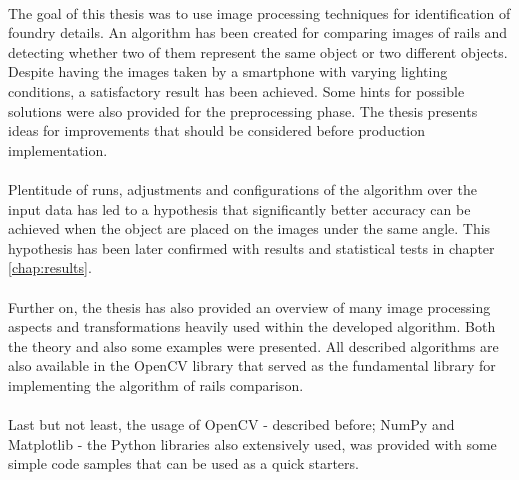 \paragraph{}
The goal of this thesis was to use image processing techniques for identification of foundry details. An algorithm has been created for comparing images of rails and detecting whether two of them represent the same object or two different objects. Despite having the images taken by a smartphone with varying lighting conditions, a satisfactory result has been achieved. Some hints for possible solutions were also provided for the preprocessing phase. The thesis presents ideas for improvements that should be considered before production implementation.

\paragraph{}
Plentitude of runs, adjustments and configurations of the algorithm over the input data has led to a hypothesis that significantly better accuracy can be achieved when the object are placed on the images under the same angle. This hypothesis has been later confirmed with results and statistical tests in chapter \ref{chap:results}.

\paragraph{}
Further on, the thesis has also provided an overview of many image processing aspects and transformations heavily used within the developed algorithm. Both the theory and also some examples were presented. All described algorithms are also available in the OpenCV library that served as the fundamental library for implementing the algorithm of rails comparison.

\paragraph{}
Last but not least, the usage of OpenCV - described before; NumPy and Matplotlib - the Python libraries also extensively used, was provided with some simple code samples that can be used as a quick starters.